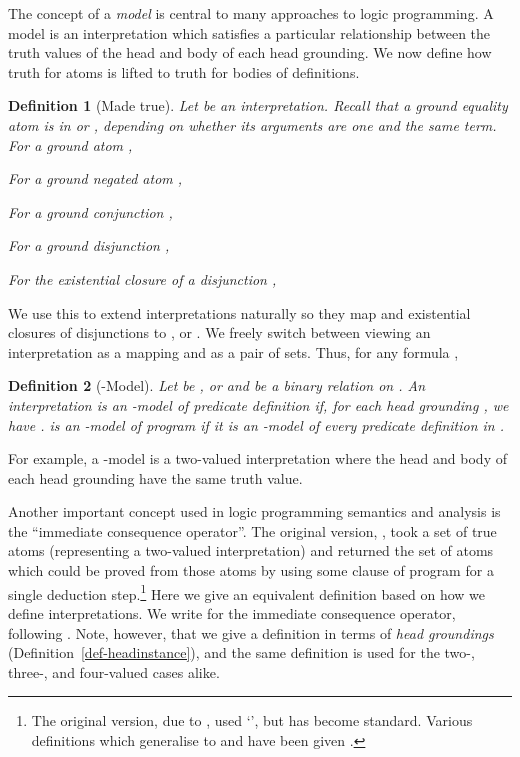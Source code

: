 \documentclass{tlp}
\newtheorem{definition}{Definition}
\begin{document}
The concept of a \emph{model} is central to many approaches to logic
programming.   A model is an interpretation which satisfies a particular
relationship between the truth values of the head and body of each head
grounding.  We now define how truth for atoms is lifted to truth for
bodies of definitions.

\begin{definition}[Made true] \rm
Let  be an interpretation.
Recall that a ground equality atom is in  or , depending on
whether its arguments are one and the same term.
\\

\noindent
For a ground atom ,
\vspace*{-1ex}

For a ground negated atom ,
\vspace*{-1ex}

For a ground conjunction ,
\vspace*{-1ex}

For a ground disjunction ,
\vspace*{-1ex}

For the existential closure of a disjunction ,
\vspace*{-1ex}

\end{definition}
We use this to extend interpretations naturally so they map  and
existential closures of disjunctions to ,  or .
We freely switch between viewing an interpretation as a mapping and
as a pair of sets.
Thus, for any formula ,


\begin{definition}[-Model] \rm

Let  be ,  or  and 
be a binary relation on .
An interpretation  is an -model
of predicate definition  if, for each head 
grounding , we have
.
 is an -model of program  if it is an
-model of every predicate definition in .
\end{definition}
For example, a -model is a two-valued interpretation where the
head and body of each head grounding have the same truth value.

Another important concept used in logic programming semantics and analysis
is the ``immediate consequence operator''.  The original version, ,
took a set of true atoms (representing a two-valued interpretation)
and returned the set of atoms which could be proved from those atoms
by using some clause of program  for a single deduction 
step.\footnote{The original version, due to 
, used `', but  has become standard.
Various definitions which generalise 
to  and  have been given \cite{apt94logic}.}
Here we give an equivalent definition based on how we define 
interpretations.
We write  for the immediate consequence operator, following
.
Note, however, that we give  a definition in terms of
\emph{head groundings} (Definition~\ref{def-headinstance}),
and the same definition is used for the two-, three-, and
four-valued cases alike.
\end{document}

